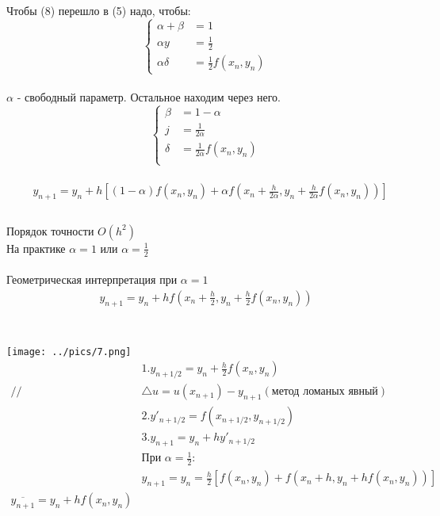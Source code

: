\documentclass[12pt,a4paper]{article}
\begin{document}
	Чтобы (8) перешло в (5) надо, чтобы:\\
	\begin{equation*}
	\begin{cases}
		\alpha + \beta &= 1\\
		\alpha y &= \frac{1}{2}\\
		\alpha \delta &= \frac{1}{2} f(x_n, y_n)
	\end{cases}
	\end{equation*}\\
	$\alpha$ - свободный параметр. Остальное находим через него. \\
		\begin{equation*}
	\begin{cases}
		\beta &= 1 - \alpha\\
		j &= \frac{1}{2\alpha}\\
		\delta &= \frac{1}{2\alpha} f(x_n, y_n)\\
	\end{cases}	
	\end{equation*}\\
	\begin{align*}
	&y_{n+1} = y_n + h \left[ ( 1 - \alpha) f(x_n, y_n) + \alpha f(x_n + \frac{h}{2\alpha}, y_n + \frac{h}{2\alpha}f(x_n, y_n))\right]\\
	\end{align*}\\
	Порядок точности $O(h^2)$\\
	На практике $\alpha = 1$ или $\alpha = \frac{1}{2}$\\\\
	Геометрическая интерпретация при $\alpha = 1$\\
	\begin{align*}
	y_{n+1} = y_n + h f(x_n + \frac{h}{2}, y_n + \frac{h}{2} f(x_n, y_n))\\
	\end{align*}\\\\
	\texttt{[image: ../pics/7.png]}\\
	\begin{align*}
	&1. y_{n+1/2} = y_n + \frac{h}{2}f(x_n, y_n)\\
	//&\triangle u = u(x_{n+1}) - y_{n+1} (\text{метод ломаных явный})\\
	&2. y'_{n+1/2} = f(x_{n+1/2}, y_{n+1/2})\\
	&3. y_{n+1} = y_n +  h y'_{n+1/2}\\
	&\text{При } \alpha = \frac{1}{2}:\\
	&y_{n+1} = y_n = \frac{h}{2} \left[f(x_n, y_n) + f(x_n + h, y_n + hf(x_n, y_n))\right]\\
	\overline{y_{n+1}} = y_n + h f(x_n, y_n)\\
	\end{align*}
\end{document}
